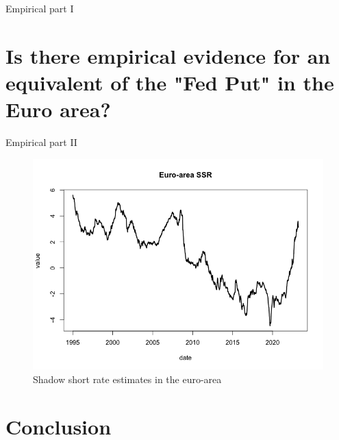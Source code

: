 Empirical part I

\chapter{Is there empirical evidence for an equivalent of the "Fed Put" in the Euro area?}

Empirical part II

\begin{figure}[h]
    \centering
    \includegraphics[width=\textwidth]{figures/plot_shadow_short_rate_euro_area}
    \caption{Shadow short rate estimates in the euro-area}
    \label{fig:euroareassr}
\end{figure}

\chapter{Conclusion}


